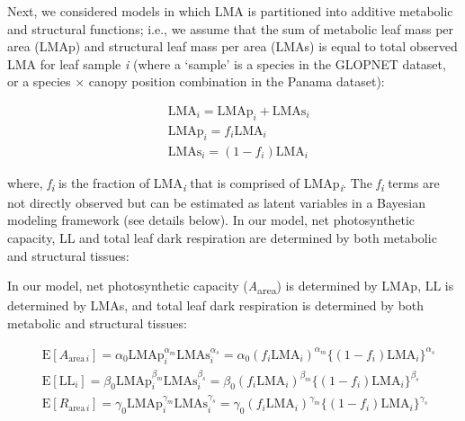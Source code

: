 \documentclass[
  12pt,
]{article}
\begin{document}
Next, we considered models in which LMA is partitioned into additive metabolic and structural functions; i.e., we assume that the sum of metabolic leaf mass per area (LMAp) and structural leaf mass per area (LMAs) is equal to total observed LMA for leaf sample \emph{i} (where a `sample' is a species in the GLOPNET dataset, or a species × canopy position combination in the Panama dataset):

\begin{align}
  &\mathrm{LMA}_{i} =\mathrm{LMAp}_{i} + \mathrm{LMAs}_{i} \label{eq:LMA}\\
  &\mathrm{LMAp}_{i} = f_{i} \mathrm{LMA}_{i} \label{eq:LMAp}\\
  &\mathrm{LMAs}_{i} = (1 - f_{i})  \mathrm{LMA}_{i}\label{eq:LMAs}
\end{align}

where, \emph{f\textsubscript{i}} is the fraction of LMA\textsubscript{\emph{i}} that is comprised of LMAp\textsubscript{\emph{i}}.
The \emph{f\textsubscript{i}} terms are not directly observed but can be estimated as latent variables in a Bayesian modeling framework (see details below).
In our model, net photosynthetic capacity, LL and total leaf dark respiration are determined by both metabolic and structural tissues:

In our model, net photosynthetic capacity (\emph{A}\textsubscript{area}) is determined by LMAp, LL is determined by LMAs, and total leaf dark respiration is determined by both metabolic and structural tissues:

\begin{align}
& \mathrm{E}[A_{\mathrm{area} \, i}]
= \alpha_0\mathrm{LMAp}_{i}^{\alpha_m}\mathrm{LMAs}_i^{\alpha_s}  =  \alpha_0 (f_i \mathrm{LMA}_{i})^{\alpha_m} \bigl\{(1-f_i) \mathrm{LMA}_{i}\bigr\}^{\alpha_s} \label{eq:E-A} \\
& \mathrm{E}[\mathrm{LL}_i] = \beta_0\mathrm{LMAp}_{i}^{\beta_m} \mathrm{LMAs}_{i}^{\beta_s}   = \beta_0 (f_i \mathrm{LMA}_{i})^{\beta_m} \bigl\{(1-f_i) \mathrm{LMA}_{i}\bigr\}^{\beta_s} \label{eq:E-LL} \\
& \mathrm{E}[R_{\mathrm{area} \, i}]
= \gamma_0\mathrm{LMAp}_{i}^{\gamma_m} \mathrm{LMAs}_{i}^{\gamma_s}
= \gamma_0 (f_i \mathrm{LMA}_{i})^{\gamma_m} \bigl\{(1-f_i)\mathrm{LMA}_{i}\bigr\}^{\gamma_s} \label{eq:E-R}
\end{align}
\end{document}
